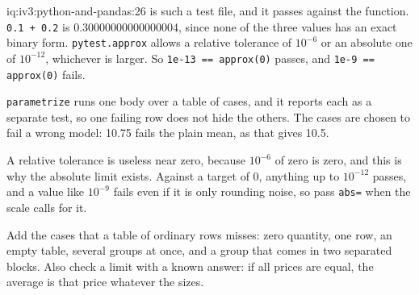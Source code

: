 \begin{solution}{iq:iv3:python-and-pandas:26}
 is such a test file, and it passes against the function. \texttt{0.1 + 0.2} is 0.30000000000000004, since none of the three values has an exact binary form. \texttt{pytest.approx} allows a relative tolerance of $10^{-6}$ or an absolute one of $10^{-12}$, whichever is larger. So \texttt{1e-13 == approx(0)} passes, and \texttt{1e-9 == approx(0)} fails.
\label{lst:iv3:pp:checks}

\texttt{parametrize} runs one body over a table of cases, and it reports each as a separate test, so one failing row does not hide the others. The cases are chosen to fail a wrong model: 10.75 fails the plain mean, as that gives 10.5.

A relative tolerance is useless near zero, because $10^{-6}$ of zero is zero, and this is why the absolute limit exists. Against a target of 0, anything up to $10^{-12}$ passes, and a value like $10^{-9}$ fails even if it is only rounding noise, so pass \texttt{abs=} when the scale calls for it.

Add the cases that a table of ordinary rows misses: zero quantity, one row, an empty table, several groups at once, and a group that comes in two separated blocks. Also check a limit with a known answer: if all prices are equal, the average is that price whatever the sizes.

\end{solution}

